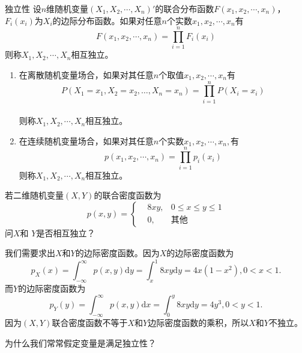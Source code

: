  \begin{note}
     \vspace{5cm}
 \end{note}

 \begin{definition}{独立性}\label{def:independence}
 设$n$维随机变量$\left(X_{1}, X_{2}, \cdots, X_{n}\right)' $的联合分布函数$F(x_{1}, x_{2}, \cdots, x_{n})$，$F_{i}\left(x_{i}\right)$为$X_{i}$的边际分布函数。如果对任意$n$个实数$x_{1}, x_{2}, \cdots, x_{n}$有$$F\left(x_{1}, x_{2}, \cdots, x_{n}\right)=\prod_{i=1}^{n} F_{i}(x_{i})$$
 则称$X_{1}, X_{2}, \cdots, X_{n}$相互独立。
 \begin{enumerate}
     \item 在离散随机变量场合，如果对其任意$n$个取值$x_{1}, x_{2}, \cdots, x_{n}$有$$P\left(X_{1}=x_{1}, X_{2}=x_{2}, \ldots, X_{n}=x_{n}\right)=\prod_{i=1}^{n} P\left(X_{i}=x_{i}\right)$$\\
 则称$X_{1}, X_{2}, \cdots, X_{n}$相互独立。
 \item 在连续随机变量场合，如果对其任意$n$个实数$x_{1}, x_{2}, \cdots, x_{n},$有$$p\left(x_{1}, x_{2}, \cdots, x_{n}\right)=\prod_{i=1}^{n} p_{i}\left(x_{i}\right)$$
 则称$X_{1}, X_{2}, \cdots, X_{n}$相互独立。
 \end{enumerate}
 \end{definition}
 \begin{example}
     若二维随机变量$(X,Y)$的联合密度函数为
     $$
     p(x,y) = \left\{
     \begin{aligned}
         & 8xy, & 0\leq x \leq y \leq 1\\
         &0, & \text{其他}
     \end{aligned}
     \right.
     $$
     问$X$和 $Y$是否相互独立？
 \end{example}
 \begin{solution}
我们需要求出$X$和$Y$的边际密度函数。因为$X$的边际密度函数为
$$
p_X(x) = \int_{-\infty}^{\infty} p(x,y)\text{d}y = \int_{x}^{1} 8xy \text{d}y = 4x(1-x^2), 0<x<1.
$$
而$Y$的边际密度函数为
$$
p_Y(y) = \int_{-\infty}^{\infty} p(x,y)\text{d}x = \int_{0}^{y} 8xy \text{d}y = 4y^3, 0<y<1.
$$
因为$(X,Y)$联合密度函数不等于$X$和$Y$边际密度函数的乘积，所以$X$和$Y$不独立。
 \end{solution}
\begin{problem}
    为什么我们常常假定变量是满足独立性？
\end{problem}
\begin{note}
    \vspace{3cm}
\end{note}
